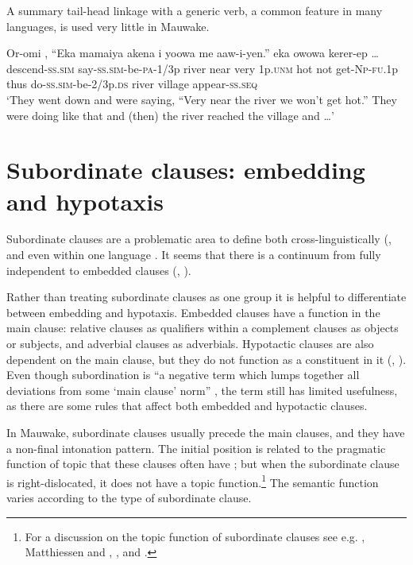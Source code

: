 A summary tail-head linkage with a generic verb, a common feature in many  languages, is used very little in Mauwake. 

\ea%
\label{ex:8:x1520}
\gll Or-omi  ,  ``Eka  mamaiya  akena i  yoowa  me  aaw-i-yen.''    eka owowa kerer-ep {\dots}\\
descend-\textsc{ss}.\textsc{sim} say-\textsc{ss}.\textsc{sim}-be-\textsc{pa}-1/3p river near very 1p.\textsc{unm} hot  not  get-\textsc{Np}-\textsc{fu}.1p thus do-\textsc{ss}.\textsc{sim}-be-2/3p.\textsc{ds} river  village  appear-\textsc{ss}.\textsc{seq}\\
\glt`They went down and were saying, ``Very near the river we won't get hot.'' They were doing like that and (then) the river reached the village and {\dots}'
\z


\section{Subordinate clauses: embedding and hypotaxis}

Subordinate clauses are a problematic area to define both cross-linguistically (\citealt{HaimanEtAl1984}, \citealt[317]{MatthiessenEtAl1988} and even within one language \citep[848]{Givon1990}. It seems that there is a continuum from fully independent to embedded clauses (\citealt[207]{Reesink1987}, \citealt[189]{Lehmann1988}). 

Rather than treating subordinate clauses as one group it is helpful to differentiate between embedding and hypotaxis. Embedded clauses have a function in the main clause: relative clauses as qualifiers within a  complement clauses as objects or subjects, and adverbial clauses as adverbials. Hypotactic clauses are also dependent on the main clause, but they do not function as a constituent in it (\citealt[219]{Halliday1985}, \citealt{Lehmann1988}). Even though subordination is ``a negative term which lumps together all deviations from some `main clause' norm'' \citep[510]{HaimanEtAl1984}%
, the term still has limited usefulness, as there are some rules that affect both embedded and hypotactic clauses.  

In Mauwake, subordinate clauses usually precede the main clauses, and they have a non-final intonation pattern. The initial position is related to the pragmatic function of topic that these clauses often have \citep[187]{Lehmann1988}; but when the subordinate clause is right-dislocated, it does not have a topic function.\footnote{For a discussion on the topic function of subordinate clauses see e.g. \citet{Reesink1983b, Reesink1987}, Matthiessen and \citet{Thompson1988}, \citet{LehmannEtAl1988}, and \citet{LongacreEtAl2007}.}  The semantic function varies according to the type of subordinate clause. 

